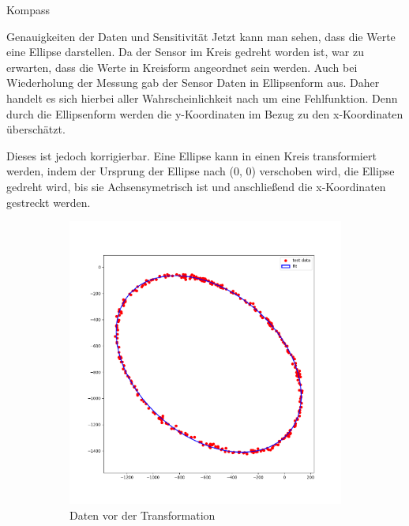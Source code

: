 \documentclass[12pt]{report}
\begin{document}
\begin{section}{Kompass}
\begin{subsection}{Genauigkeiten der Daten und Sensitivität}
  Jetzt kann man sehen, dass die Werte eine Ellipse darstellen. Da der Sensor im
  Kreis gedreht worden ist, war zu erwarten, dass die Werte in Kreisform
  angeordnet sein werden. Auch bei Wiederholung der Messung gab der Sensor Daten
  in Ellipsenform aus. Daher handelt es sich hierbei aller Wahrscheinlichkeit
  nach um eine Fehlfunktion. Denn durch die Ellipsenform werden die
  y-Koordinaten im Bezug zu den x-Koordinaten überschätzt.

  Dieses ist jedoch korrigierbar. Eine Ellipse kann in einen Kreis transformiert
  werden, indem der Ursprung der Ellipse nach (0, 0) verschoben wird, die
  Ellipse gedreht wird, bis sie Achsensymetrisch ist und anschließend die
  x-Koordinaten gestreckt werden.

  \begin{figure}[h!]
    \centering
    \captionsetup[subfigure]{labelformat=empty}
    \begin{subfigure}{0.45\linewidth}
      \includegraphics[width=\linewidth]{lernportfolio_assets/MagnetDatenMitEllipse.png}
      \caption{Daten vor der Transformation}
    \end{subfigure}
    \begin{subfigure}{0.45\linewidth}

\end{subfigure}
\end{figure}
\end{subsection}
\end{section}
\end{document}
